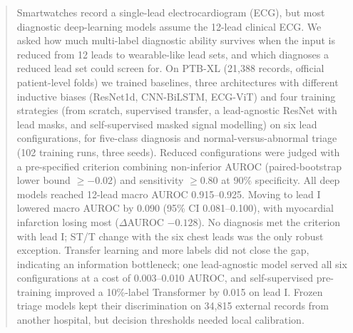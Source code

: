 \begin{abstract}
\noindent Smartwatches record a single-lead electrocardiogram (ECG), but most diagnostic deep-learning models assume the 12-lead clinical ECG. We asked how much multi-label diagnostic ability survives when the input is reduced from 12 leads to wearable-like lead sets, and which diagnoses a reduced lead set could screen for. On PTB-XL (21,388 records, official patient-level folds) we trained baselines, three architectures with different inductive biases (ResNet1d, CNN-BiLSTM, ECG-ViT) and four training strategies (from scratch, supervised transfer, a lead-agnostic ResNet with lead masks, and self-supervised masked signal modelling) on six lead configurations, for five-class diagnosis and normal-versus-abnormal triage (102 training runs, three seeds). Reduced configurations were judged with a pre-specified criterion combining non-inferior AUROC (paired-bootstrap lower bound $\geq -0.02$) and sensitivity $\geq 0.80$ at 90\% specificity. All deep models reached 12-lead macro AUROC 0.915--0.925. Moving to lead I lowered macro AUROC by 0.090 (95\% CI 0.081--0.100), with myocardial infarction losing most ($\Delta$AUROC $-0.128$). No diagnosis met the criterion with lead I; ST/T change with the six chest leads was the only robust exception. Transfer learning and more labels did not close the gap, indicating an information bottleneck; one lead-agnostic model served all six configurations at a cost of 0.003--0.010 AUROC, and self-supervised pre-training improved a 10\%-label Transformer by 0.015 on lead I. Frozen triage models kept their discrimination on 34,815 external records from another hospital, but decision thresholds needed local calibration.
\end{abstract}
